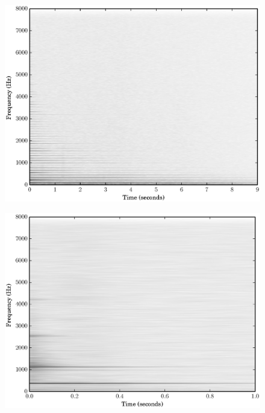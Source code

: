 \begin{figure}[!t]
    \centering
    \includegraphics[width=\figwidthscale\textwidth]{plots/ac_gtr_orig_spec.eps}
    \CaptionWithTitle{%
    }{\label{plot:acgtra3specgram}}
\end{figure}

\begin{figure}[!t]
    \centering
    \includegraphics[width=\figwidthscale\textwidth]{plots/xylo_orig_spec.eps}
    \CaptionWithTitle{%
    }{\label{plot:xylofs4specgram}}
\end{figure}

